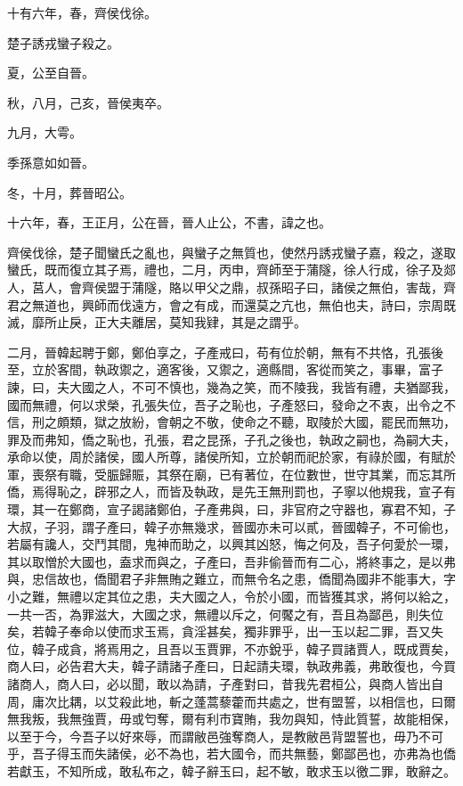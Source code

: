 \begin{pinyinscope}
十有六年，春，齊侯伐徐。

楚子誘戎蠻子殺之。

夏，公至自晉。

秋，八月，己亥，晉侯夷卒。

九月，大雩。

季孫意如如晉。

冬，十月，葬晉昭公。

十六年，春，王正月，公在晉，晉人止公，不書，諱之也。

齊侯伐徐，楚子聞蠻氏之亂也，與蠻子之無質也，使然丹誘戎蠻子嘉，殺之，遂取蠻氏，既而復立其子焉，禮也，二月，丙申，齊師至于蒲隧，徐人行成，徐子及郯人，莒人，會齊侯盟于蒲隧，賂以甲父之鼎，叔孫昭子曰，諸侯之無伯，害哉，齊君之無道也，興師而伐遠方，會之有成，而還莫之亢也，無伯也夫，詩曰，宗周既滅，靡所止戾，正大夫離居，莫知我肄，其是之謂乎。

二月，晉韓起聘于鄭，鄭伯享之，子產戒曰，苟有位於朝，無有不共恪，孔張後至，立於客間，執政禦之，適客後，又禦之，適縣間，客從而笑之，事畢，富子諫，曰，夫大國之人，不可不慎也，幾為之笑，而不陵我，我皆有禮，夫猶鄙我，國而無禮，何以求榮，孔張失位，吾子之恥也，子產怒曰，發命之不衷，出令之不信，刑之頗類，獄之放紛，會朝之不敬，使命之不聽，取陵於大國，罷民而無功，罪及而弗知，僑之恥也，孔張，君之昆孫，子孔之後也，執政之嗣也，為嗣大夫，承命以使，周於諸侯，國人所尊，諸侯所知，立於朝而祀於家，有祿於國，有賦於軍，喪祭有職，受脤歸賑，其祭在廟，已有著位，在位數世，世守其業，而忘其所僑，焉得恥之，辟邪之人，而皆及執政，是先王無刑罰也，子寧以他規我，宣子有環，其一在鄭商，宣子謁諸鄭伯，子產弗與，曰，非官府之守器也，寡君不知，子大叔，子羽，謂子產曰，韓子亦無幾求，晉國亦未可以貳，晉國韓子，不可偷也，若屬有讒人，交鬥其間，鬼神而助之，以興其凶怒，悔之何及，吾子何愛於一環，其以取憎於大國也，盍求而與之，子產曰，吾非偷晉而有二心，將終事之，是以弗與，忠信故也，僑聞君子非無賄之難立，而無令名之患，僑聞為國非不能事大，字小之難，無禮以定其位之患，夫大國之人，令於小國，而皆獲其求，將何以給之，一共一否，為罪滋大，大國之求，無禮以斥之，何饜之有，吾且為鄙邑，則失位矣，若韓子奉命以使而求玉焉，貪淫甚矣，獨非罪乎，出一玉以起二罪，吾又失位，韓子成貪，將焉用之，且吾以玉賈罪，不亦銳乎，韓子買諸賈人，既成賈矣，商人曰，必告君大夫，韓子請諸子產曰，日起請夫環，執政弗義，弗敢復也，今買諸商人，商人曰，必以聞，敢以為請，子產對曰，昔我先君桓公，與商人皆出自周，庸次比耦，以艾殺此地，斬之蓬蒿藜藿而共處之，世有盟誓，以相信也，曰爾無我叛，我無強賈，毋或匄奪，爾有利市寶賄，我勿與知，恃此質誓，故能相保，以至于今，今吾子以好來辱，而謂敝邑強奪商人，是教敝邑背盟誓也，毋乃不可乎，吾子得玉而失諸侯，必不為也，若大國令，而共無藝，鄭鄙邑也，亦弗為也僑若獻玉，不知所成，敢私布之，韓子辭玉曰，起不敏，敢求玉以徼二罪，敢辭之。


\end{pinyinscope}
